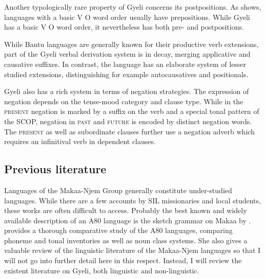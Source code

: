 Another typologically rare property of Gyeli concerns its postpositions. As \citet{dryer2013a} shows, languages with a basic V O word order usually have prepositions. While Gyeli has a basic V O word order, it  nevertheless has both pre- and postpositions.

While Bantu languages are generally known for their productive verb extensions, part of the Gyeli verbal derivation system is in decay, merging applicative and causative suffixes. In contrast, the language has an elaborate system of lesser studied extensions, distinguishing for example autocausatives and positionals.

Gyeli also has a rich system in terms of negation strategies. The expression of negation depends on the tense-mood category and clause type. While in the \textsc{present} negation is marked by a suffix on the verb and a special tonal pattern of the SCOP, negation in \textsc{past} and \textsc{future} is encoded by distinct negation words. The \textsc{present} as well as subordinate clauses further use a negation adverb which requires an infinitival verb in dependent clauses.



\subsection{Previous literature}

Languages of the Makaa-Njem Group generally constitute under-studied languages. While there are a few accounts by SIL missionaries and local students, these works are often difficult to access. Probably the best known and widely available description of an A80 language is the sketch grammar on Makaa by \citet{heath2003}.  \citet{cheucle2014} provides a thorough comparative study of the A80 languages, comparing phoneme and tonal inventories as well as noun class systems. She also gives a valuable review of the linguistic literature of the Makaa-Njem languages so that I will not go into further detail here in this respect. Instead, I will review the existent literature on Gyeli, both linguistic and non-linguistic.

